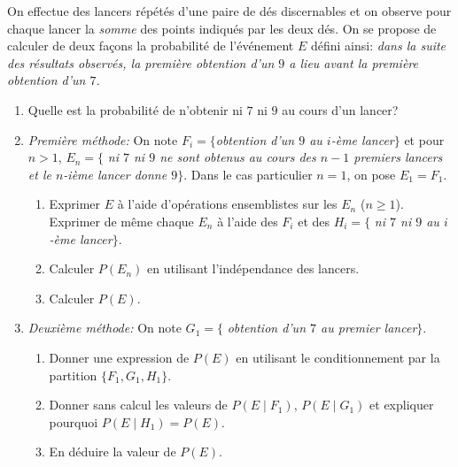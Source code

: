 \documentclass[a4paper,12pt,reqno]{amsart}
\begin{document}
\begin{exo}

  On effectue des lancers répétés d'une paire de dés discernables et on observe pour
  chaque lancer la \emph{somme} des points indiqués par les deux dés. On se
  propose de calculer de deux façons la probabilité de l'événement $E$ défini
  ainsi: \emph{dans la suite des résultats observés, la première obtention d'un
  $9$ a lieu avant la première obtention d'un $7$.}

  \begin{enumerate}
    \item  Quelle est la probabilité de n'obtenir ni $7$ ni $9$ au cours d'un lancer?
    \item \emph{Première méthode:} On note $F_i=\{$\emph{obtention d'un $9$ au $i$-ème lancer}$\}$ et pour $n>1$, $E_n=\{$ \emph{ni $7$ ni $9$ ne sont obtenus au cours des $n-1$ premiers lancers et le $n$-ième lancer donne $9$}$\}$. Dans le cas particulier $n=1$, on pose $E_1=F_1$.
      \begin{enumerate}
        \item Exprimer $E$ à l'aide d'opérations ensemblistes sur les $E_n$ ($n\geq 1$). Exprimer de même chaque $E_n$ à l'aide  des $F_i$ et des  $H_i=\{$ \emph{ni $7$ ni $9$ au $i$-ème lancer}$\}$.
        \item Calculer $P(E_n)$ en utilisant l'indépendance des lancers.
        \item Calculer $P(E)$.
      \end{enumerate}
    \item \emph{Deuxième méthode:}  On note $G_1=\{$ \emph{obtention d'un $7$ au premier lancer}$\}$.
      \begin{enumerate}
        \item Donner une expression de $P(E)$ en utilisant le conditionnement par la partition $\{F_1,G_1,H_1\}$.
        \item Donner sans calcul les valeurs de $P(E\mid F_1)$, $P(E\mid G_1)$ et expliquer pourquoi $P(E\mid H_1)=P(E)$.
        \item En déduire la valeur de $P(E)$.
      \end{enumerate}
  \end{enumerate}

\end{exo}
\end{document}
